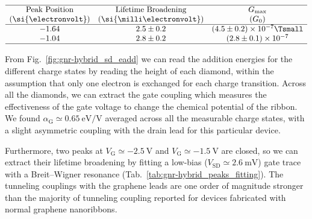 \begin{table}
    \caption{\label{tab:gnr-hybrid_peaks_fitting}
        Lorentzian fit parameters extracted by fitting a low-bias gate trace. The two peaks are separated by 600 meV in voltage, which could be assigned to the single-electron charge transition $N \leftrightarrow N+1$, where $N$ is the number of electrons on the ribbons which is unknown. Reported errors are fitting errors.}
    \[
        \begin{array}{ccc}
            \hline\textrm{Peak Position}  & \textrm{Lifetime Broadening} & G_\textrm{max}                   \\
            \textrm{(\si{\electronvolt})} & (\si{\milli\electronvolt})   & (G_0)                            \\
            \hline
            -1.64                         & 2.5\pm0.2                    & (4.5\pm0.2)\times10^{-7} \Tsmall \\
            -1.04                         & 2.8\pm0.2                    & (2.8\pm0.1)\times10^{-7}         \\
            \hline
        \end{array}
    \]
\end{table}

From Fig.~\ref{fig:gnr-hybrid_sd_eadd} we can read the addition energies for the different charge states by reading the height of each diamond, within the assumption that only one electron is exchanged for each charge transition. Across all the diamonds, we can extract the gate coupling which measures the effectiveness of the gate voltage to change the chemical potential of the ribbon. We found $\alpha_\textrm{G}\simeq\SI{0.65}{\electronvolt\per\volt}$ averaged across all the measurable charge states, with a slight asymmetric coupling with the drain lead for this particular device.

Furthermore, two peaks at $V_\textrm{G}\simeq\SI{-2.5}{\volt}$ and $V_\textrm{G}\simeq\SI{-1.5}{\volt}$ are closed, so we can extract their lifetime broadening by fitting a low-bias ($V_\textrm{SD}\simeq\SI{2.6}{\milli\volt}$) gate trace with a Breit--Wigner resonance (Tab.~\ref{tab:gnr-hybrid_peaks_fitting}). The tunneling couplings with the graphene leads are one order of magnitude stronger than the majority of tunneling coupling reported for devices fabricated with normal graphene nanoribbons.

